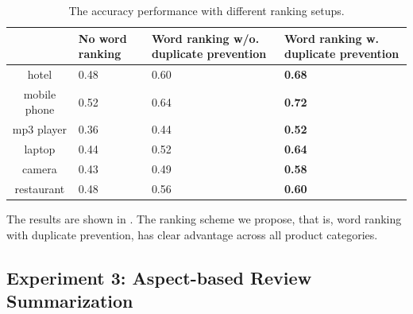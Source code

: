\begin{table}[th]
	\centering
	\caption{The accuracy performance with different ranking setups.}
	\label{table:rankingeffect}
	\begin{tabular}{|c|C{1.5cm}|C{1.5cm}|C{1.5cm}|}
		\hline
		 & No word ranking & Word ranking w/o. duplicate prevention & Word ranking w. duplicate prevention \\ \hline
		hotel &0.48 &0.60 & \textbf{0.68} \\ \hline
		mobile phone &0.52 &0.64 & \textbf{0.72} \\ \hline
		mp3 player &0.36 & 0.44 & \textbf{0.52} \\ \hline
		laptop & 0.44 &0.52 & \textbf{0.64} \\ \hline
		camera & 0.43 &0.49 & \textbf{0.58} \\ \hline
		restaurant &0.48 &0.56 & \textbf{0.60} \\ \hline	
	\end{tabular}
\end{table}


The results are shown in .
The ranking scheme we propose, that is, word ranking with duplicate prevention,
has clear advantage across all product categories.

\subsection{Experiment 3: Aspect-based Review Summarization}
\label{sec:exp4}

